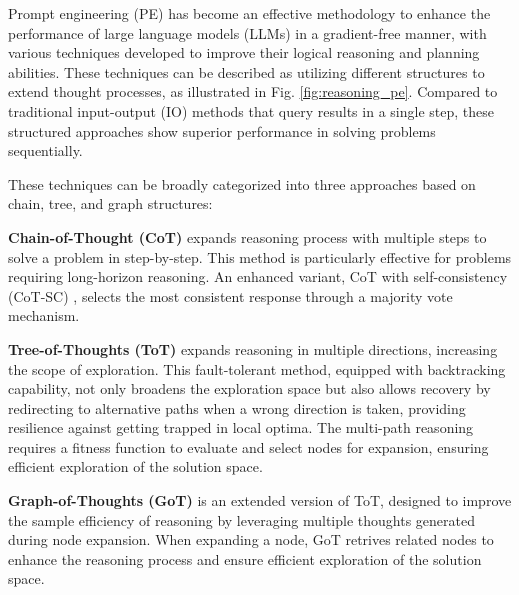 Prompt engineering (PE) has become an effective methodology to enhance the performance of large language models (LLMs) in a gradient-free manner, with various techniques developed to improve their logical reasoning and planning abilities. These techniques can be described as utilizing different structures to extend thought processes, as illustrated in Fig. \ref{fig:reasoning_pe}. Compared to traditional input-output (IO) methods that query results in a single step, these structured approaches show superior performance in solving problems sequentially.

These techniques can be broadly categorized into three approaches based on chain, tree, and graph structures:

\textbf{Chain-of-Thought (CoT)} \cite{wei2022chain,kojima2022large} expands reasoning process with multiple steps to solve a problem in step-by-step. This method is particularly effective for problems requiring long-horizon reasoning. An enhanced variant, CoT with self-consistency (CoT-SC) \cite{wang2022self}, selects the most consistent response through a majority vote mechanism.

\textbf{Tree-of-Thoughts (ToT)} \cite{yao2024tree} expands reasoning in multiple directions, increasing the scope of exploration.
This fault-tolerant method, equipped with backtracking capability, not only broadens the exploration space but also allows recovery by redirecting to alternative paths when a wrong direction is taken, providing resilience against getting trapped in local optima.
The multi-path reasoning requires a fitness function to evaluate and select nodes for expansion, ensuring efficient exploration of the solution space.


\textbf{Graph-of-Thoughts (GoT)} \cite{besta2024graph} is an extended version of ToT, designed to improve the sample efficiency of reasoning by leveraging multiple thoughts generated during node expansion. When expanding a node, GoT retrives related nodes to enhance the reasoning process and ensure efficient exploration of the solution space.
